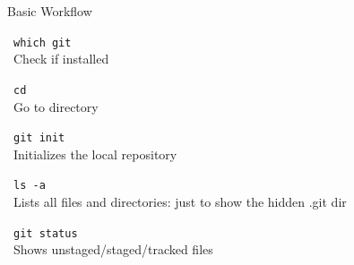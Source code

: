 \documentclass[12pt]{beamer}
\begin{document}
\begin{frame}{Basic Workflow}

\textbullet\ \texttt{which git} \\
\qquad \textbullet\ {\footnotesize Check if installed} \\
\vspace{.4cm}

\textbullet\ \texttt{cd } \\
\qquad \textbullet\ {\footnotesize Go to directory} \\
\vspace{.4cm}

\textbullet\ \texttt{git init} \\
\qquad \textbullet\ {\footnotesize Initializes the local repository} \\
\vspace{.4cm}

\textbullet\ \texttt{ls -a} \\
\qquad \textbullet\ {\footnotesize Lists all files and directories: just to show the hidden .git dir} \\
\vspace{.4cm}

\textbullet\ \texttt{git status} \\
\qquad \textbullet\ {\footnotesize Shows unstaged/staged/tracked files} \\
\vspace{.4cm}

\end{frame}
\end{document}
